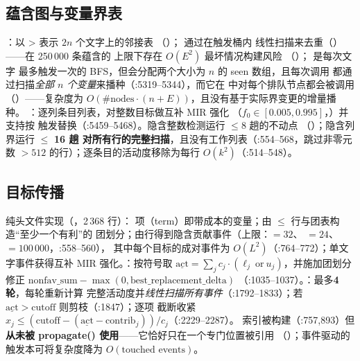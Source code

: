 \documentclass[11pt]{ctexart}
\begin{document}
\subsection{蕴含图与变量界表}
：以
> 表示 $2n$ 个文字上的邻接表
（）； 通过在触发桶内
线性扫描来去重（）——在 250\,000 条蕴含的
上限下存在 $O(E^2)$ 最坏情况构建风险
（）； 是每次文字
最多触发一次的 BFS，但会分配两个大小为 $n$ 的 seen 数组，且每次调用
都通过扫描\emph{全部 $n$ 个变量}来播种（:5319--5344），而它在
 中对每个排队节点都会被调用
（）——复杂度为
$O(\#\mathrm{nodes} \cdot (n{+}E))$，且没有基于实际界变更的增量播种。
：逐列条目列表，对整数目标做互补 MIR 强化
（$f_0 \in [0.005, 0.995]$，）并支持按
触发替换（:5459--5468）。隐含整数检测运行 $\le 8$ 趟的不动点
（）；隐含列界运行 $\le$ \textbf{16 趟
对所有行的完整扫描}，且没有工作列表（:554--568，跳过非零元数 $>512$
的行）；逐条目的活动度移除为每行 $O(k^2)$（:514--548）。

\subsection{目标传播}
纯头文件实现（，2\,368 行）：
项（term）即带成本的变量；由 $\le$ 行与团表构造“至少一个有利”的
团划分；由行得到隐含贡献事件（上限：$=32$、
$=24$、$=100\,000$，:558--560），
其中每个目标的成对事件为 $O(L^2)$（:764--772）；单文字事件获得互补
MIR 强化。：按符号取
$\underline{\mathrm{act}} = \sum_j c_j \cdot
(\ell_j\ \mathrm{or}\ u_j)$，并施加团划分修正
$\mathrm{nonfav\_sum} - \max(0, \mathrm{best\_replacement\_delta})$
（:1035--1037）。：最多\textbf{4 轮}，每轮重新计算
完整活动度并\emph{线性扫描所有事件}（:1792--1833）；若
$\underline{\mathrm{act}} > \mathrm{cutoff}$ 则剪枝（:1847）；逐项
截断收紧 $x_j \le (\mathrm{cutoff} - (\underline{\mathrm{act}} -
\mathrm{contrib}_j))/c_j$（:2229--2287）。
 索引被构建（:757,893）但\textbf{从未被
propagate() 使用}——它恰好只在一个专门位置被引用
（）；事件驱动的触发本可将复杂度降为
$O(\text{touched events})$。

\end{document}
